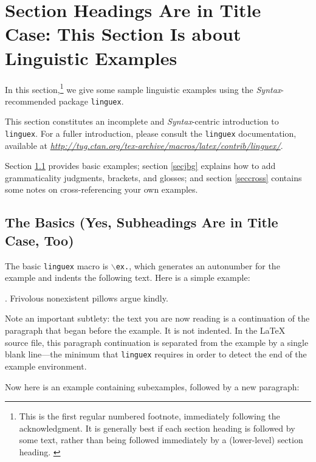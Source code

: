 \documentclass[letterpaper,12pt, twoside]{article}
\begin{document}

\section{Section Headings Are in Title Case: This Section Is about Linguistic Examples}\label{secexs}
In this section,\footnote{This is the first regular numbered footnote, immediately following the acknowledgment. It is generally best if each section heading is followed by some text, rather than being followed immediately by a (lower-level) section heading. \label{padding}}  we give some sample linguistic examples using the \emph{Syntax}-recommended package \texttt{linguex}. 

This section constitutes an incomplete and \emph{Syntax}-centric introduction to \texttt{linguex}. For a fuller introduction, please consult the \texttt{linguex} documentation, available at \emph{\href{http://tug.ctan.org/tex-archive/macros/latex/contrib/linguex/}{http://tug.ctan.org/\linebreak[1]tex-archive/macros/latex/contrib/linguex/}}.

Section \ref{secbasics} provides basic examples; section \ref{secjbg} explains how to add grammaticality judgments, brackets, and glosses; and section \ref{seccross} contains some notes on cross-referencing your own examples.

\subsection{The Basics (Yes, Subheadings Are in Title Case, Too)}\label{secbasics}
The basic \texttt{linguex} macro is \texttt{$\backslash$ex.}, which generates an autonumber for the example and indents the following text. Here is a simple example:

\ex. Frivolous nonexistent pillows argue kindly.

Note an important subtlety: the text you are now reading is a continuation of the paragraph that began before the example. It is not indented. In the LaTeX source file, this paragraph continuation is separated from the example by a single blank line---the minimum that  \texttt{linguex} requires in order to detect the end of the example environment. 

Now here is an example containing subexamples, followed by a new paragraph:
\end{document}
